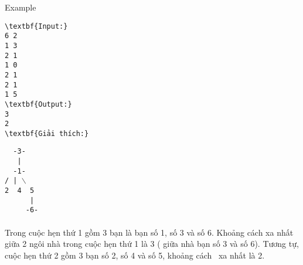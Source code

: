 Example
\begin{verbatim}
\textbf{Input:}
6 2
1 3
2 1
1 0
2 1
2 1
1 5
\textbf{Output:}
3
2
\textbf{Giải thích:}\end{verbatim}


\texttt{  -3-
\\   |
\\  -1-
\\/ | $\backslash$
\\2  4  5
\\      |
\\     -6-}
\\
\\​Trong cuộc hẹn thứ 1 gồm 3 bạn là bạn số 1, số 3 và số 6. Khoảng cách xa nhất giữa 2 ngôi nhà trong cuộc hẹn thứ 1 là 3 ( giữa nhà bạn số 3 và số 6). Tương tự, cuộc hẹn thứ 2 gồm 3 bạn số 2, số 4 và số 5, khoảng cách  xa nhất là 2.

 

 

 

 

 

 